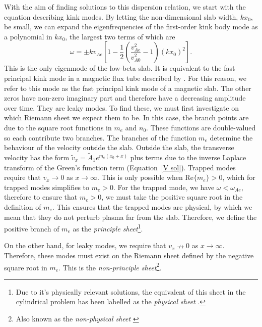 With the aim of finding solutions to this dispersion relation, we start with the equation describing kink modes. By letting the non-dimensional slab width, $kx_0$, be small, we can expand the eigenfrequencies of the first-order kink body mode as a polynomial in $kx_0$, the largest two terms of which are
\begin{equation}
\omega = \pm kv_{Ae}\left[ 1 - \frac{1}{2}\left( \frac{v_{Ae}^2}{v_{A0}^2} - 1 \right) (kx_0)^2 \right].
\end{equation}
This is the only eigenmode of the low-beta slab. It is equivalent to the fast principal kink mode in a magnetic flux tube described by \cite{cal03}. For this reason, we refer to this mode as the fast principal kink mode of a magnetic slab. The other zeros have non-zero imaginary part and therefore have a decreasing amplitude over time. They are leaky modes. To find these, we must first investigate on which Riemann sheet we expect them to be. In this case, the branch points are due to the square root functions in $m_e$ and $n_0$. These functions are double-valued so each contribute two branches. The branches of the function $m_e$ determine the behaviour of the velocity outside the slab. Outside the slab, the transverse velocity has the form $\tilde{v}_x = \tilde{A}_1e^{m_e(x_0 + x)}$ plus terms due to the inverse Laplace transform of the Green's function term (Equation~\ref{V sol}). Trapped modes require that $v_x \to 0$ as $x \to \infty$. This is only possible when $\mathrm{Re}\{m_e\} > 0$, which for trapped modes simplifies to $m_e > 0$. For the trapped mode, we have $\omega < \omega_{Ae}$, therefore to ensure that $m_e > 0$, we must take the positive square root in the definition of $m_e$. This ensures that the trapped modes are physical, by which we mean that they do not perturb plasma far from the slab. Therefore, we define the positive branch of $m_e$ as the \textit{principle sheet}\footnote{Due to it's physically relevant solutions, the equivalent of this sheet in the cylindrical problem has been labelled as the \textit{physical sheet} \citep{rud_etal06b}.}.

On the other hand, for leaky modes, we require that $v_x \nrightarrow 0$ as $x \to \infty$. Therefore, these modes must exist on the Riemann sheet defined by the negative square root in $m_e$. This is the \textit{non-principle sheet}\footnote{Also known as the \textit{non-physical sheet} \citep{rud_etal06b}}.

